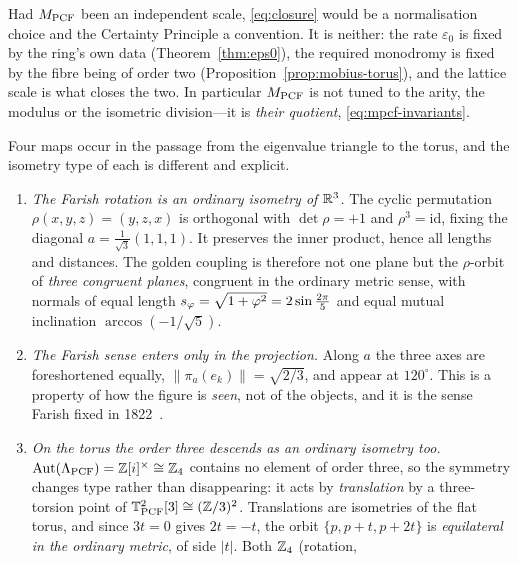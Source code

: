 \begin{remark}\label{rmk:mpcf-not-free}
Had $M_{\mathrm{PCF}}$ been an independent scale, \eqref{eq:closure} would be a normalisation choice and the
Certainty Principle a convention. It is neither: the rate $\varepsilon_0$ is fixed by the ring's own
data (Theorem~\ref{thm:eps0}), the required monodromy is fixed by the fibre being of order two
(Proposition~\ref{prop:mobius-torus}), and the lattice scale is what closes the two. In particular
$M_{\mathrm{PCF}}$ is not tuned to the arity, the modulus or the isometric division---it is
\emph{their quotient}, \eqref{eq:mpcf-invariants}.
\end{remark}

\begin{proposition}\label{prop:coupling-isometries}
Four maps occur in the passage from the eigenvalue triangle to the torus, and the isometry type of
each is different and explicit.
\begin{enumerate}
\item[(i)] \emph{The Farish rotation is an ordinary isometry of $\mathbb{R}^{3}$.} The cyclic permutation
  $\rho(x,y,z)=(y,z,x)$ is orthogonal with $\det\rho=+1$ and $\rho^{3}=\mathrm{id}$, fixing the
  diagonal $a=\tfrac{1}{\sqrt3}(1,1,1)$. It preserves the inner product, hence all lengths and
  distances. The golden coupling is therefore not one plane but the $\rho$-orbit of \emph{three
  congruent planes}, congruent in the ordinary metric sense, with normals of equal length
  $s_\varphi=\sqrt{1+\varphi^{2}}=2\sin\tfrac{2\pi}{5}$ and equal mutual inclination
  $\arccos(-1/\sqrt5)$.
\item[(ii)] \emph{The Farish sense enters only in the projection.} Along $a$ the three axes are
  foreshortened equally, $\lVert\pi_a(e_k)\rVert=\sqrt{2/3}$, and appear at $120^{\circ}$. This is
  a property of how the figure is \emph{seen}, not of the objects, and it is the sense Farish fixed
  in 1822~\cite{fgc:farish22}.
\item[(iii)] \emph{On the torus the order three descends as an ordinary isometry too.}
  $\operatorname{Aut}(\Lambda_{\mathrm{PCF}})=\mathbb{Z}[i]^{\times}\cong\mathbb{Z}_4$ contains no element of order three,
  so the symmetry changes type rather than disappearing: it acts by \emph{translation} by a
  three-torsion point of $\mathbb{T}^{2}_{\mathrm{PCF}}[3]\cong(\mathbb{Z}/3)^{2}$. Translations are isometries of
  the flat torus, and since $3t=0$ gives $2t=-t$, the orbit $\{p,p+t,p+2t\}$ is
  \emph{equilateral in the ordinary metric}, of side $\lvert t\rvert$. Both $\mathbb{Z}_4$ (rotation,

\end{enumerate}
\end{proposition}
